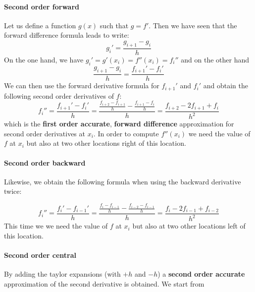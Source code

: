 \paragraph{Second order forward} 
Let us define a function $g(x)$ such that $g=f'$. Then we have seen that the forward 
difference formula leads to write: 
\begin{equation}
g_i' = \frac{g_{i+1}-g_{i}}{h}
\end{equation}
On the one hand, we have $g_i'=g'(x_i)=f''(x_i)=f_i''$ and on the other hand
\begin{equation}
\frac{g_{i+1}-g_{i}}{h} = \frac{f_{i+1}'-f_{i}'}{h}
\end{equation}
We can then use the forward derivative formula for $f_{i+1}'$ and $f_{i}'$ and 
obtain the following second order derivatives of $f$:
\begin{equation}
f_{i}'' 
= \frac{f_{i+1}'-f_i'}{h} 
= \frac{\frac{f_{i+2}-f_{i+1}}{h}-
\frac{f_{i+1}-f_i}{h}
}{h} 
= \frac{f_{i+2}-2f_{i+1}+f_i}{h^2} 
\end{equation}
which is the {\bf first order accurate}, {\bf forward difference} approximation for
second order derivatives at $x_{i}$.
In order to compute $f''(x_i)$ we need the value of $f$ at $x_i$ but also at two 
other locations right of this location.

\paragraph{Second order backward}
Likewise, we obtain the following formula when using the backward derivative twice:

\begin{equation}
f_{i}'' 
= \frac{f_{i}'-f_{i-1}'}{h} 
= \frac{\frac{f_{i}-f_{i-1}}{h}- \frac{f_{i-2}-f_{i-1}}{h}  }{h} 
= \frac{f_{i}-2f_{i-1}+f_{i-2}}{h^2} 
\end{equation}
This time we  we need the value of $f$ at $x_i$ but also at two 
other locations left of this location.

\paragraph{Second order central} 
By adding the taylor expansions (with $+h$ and $-h$) 
a {\bf second order accurate}  approximation of the second derivative is obtained.
We start from 

